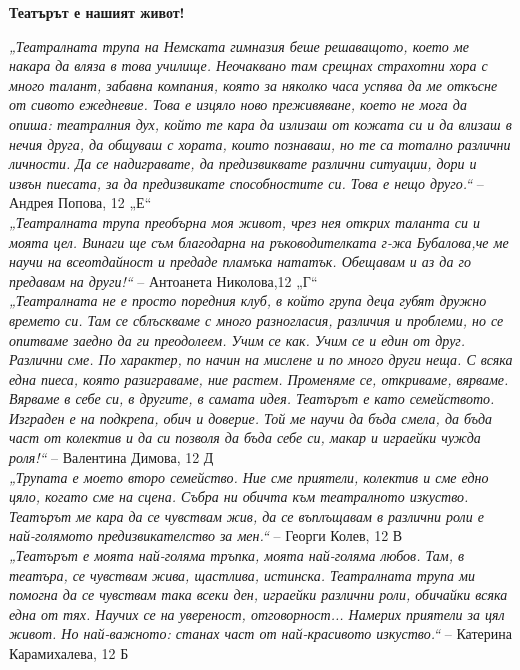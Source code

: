 \newpage
\begin{multicols}{2}

\textbf{Театърът е нашият живот!}

\textit{„Театралната трупа на Немската гимназия беше решаващото, което ме накара да вляза в това училище. Неочаквано там срещнах страхотни хора с много талант, забавна компания, която за няколко часа успява да ме откъсне от сивото ежедневие. Това е изцяло ново преживяване, което не мога да опиша: театралния дух, който те кара да излизаш от кожата си и да влизаш в нечия друга, да общуваш с хората, които познаваш, но те са тотално различни личности. Да се надигравате, да предизвиквате различни ситуации, дори и извън пиесата, за да предизвикате способностите си. Това е нещо друго.“} – Андрея Попова, 12 „Е“ \\

\textit{„Театралната трупа преобърна моя живот, чрез нея открих таланта си и моята цел. Винаги ще съм благодарна на ръководителката г-жа Бубалова,че ме научи на всеотдайност и предаде пламъка нататък. Обещавам и аз да го предавам на други!“} – Антоанета Николова,12 „Г“  \\

\textit{„Театралната не е просто поредния клуб, в който група деца губят дружно времето си. Там се сблъскваме с много разногласия, различия и проблеми, но се опитваме заедно да ги преодолеем. Учим се как. Учим се и един от друг. Различни сме. По характер, по начин на мислене и по много други неща. С всяка една пиеса, която разиграваме, ние растем. Променяме се, откриваме, вярваме. Вярваме в себе си, в другите, в самата идея. Театърът е като семейството. Изграден е на подкрепа, обич и доверие. Той ме научи да бъда смела, да бъда част от колектив и да си позволя да бъда себе си, макар и играейки чужда роля!“} – Валентина Димова, 12 Д \\

\textit{„Трупата е моето второ семейство. Ние сме приятели, колектив и сме едно цяло, когато сме на сцена. Събра ни обичта към театралното изкуство. Театърът ме кара да се чувствам жив, да се въплъщавам в различни роли е най-голямото предизвикателство за мен.“} – Георги Колев, 12 В \\

\textit{„Театърът е моята най-голяма тръпка, моята най-голяма любов. Там, в театъра, се чувствам жива, щастлива, истинска. Театралната трупа ми помогна да се чувствам така всеки ден, играейки различни роли, обичайки всяка една от тях. Научих се на увереност, отговорност... Намерих приятели за цял живот. Но най-важното: станах част от най-красивото изкуство.“} – Катерина Карамихалева, 12 Б \\


\end{multicols}
